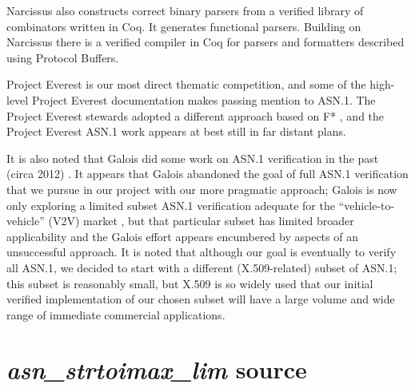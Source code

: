 \documentclass[acmsmall,nonacm]{acmart}
\begin{document}
Narcissus also constructs correct binary parsers from a verified
library of combinators written in Coq. It generates functional
parsers. Building on Narcissus there is a verified compiler in Coq for
parsers and formatters described using Protocol Buffers.

 
Project Everest \cite{TODO:19} is our most direct thematic competition, and some
of the high-level Project Everest documentation makes passing mention
to ASN.1. The Project Everest stewards adopted a different approach
based on F* \cite{TODO:4}, and the Project Everest ASN.1 work appears at best
still in far distant plans.

It is also noted that Galois did some work on ASN.1 verification in
the past (circa 2012) \cite{TODO:11}. It appears that Galois abandoned \cite{TODO:12} the
goal of full ASN.1 verification that we pursue in our project with our
more pragmatic approach; Galois is now only exploring a limited subset
ASN.1 verification adequate for the “vehicle-to-vehicle” (V2V) market
\cite{TODO:13}, but that particular subset has limited broader applicability and
the Galois effort appears encumbered by aspects of an unsuccessful
approach. It is noted that although our goal is eventually to verify
all ASN.1, we decided to start with a different (X.509-related) subset
of ASN.1; this subset is reasonably small, but X.509 is so widely used
that our initial verified implementation of our chosen subset will
have a large volume and wide range of immediate commercial
applications.


\appendix
\clearpage
\section{\emph{asn\_strtoimax\_lim} source}
\label{sec:stritomax}

{\fontsize{8}{4}\selectfont  }



\end{document}
